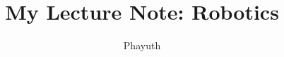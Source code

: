 \documentclass[12pt,a4paper]{book}
\begin{document}
	\title{My Lecture Note: Robotics}
	\author{Phayuth}
	\maketitle

	\tableofcontents

	
	
\end{document}
